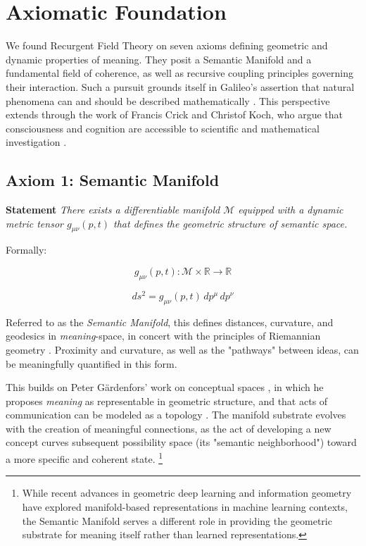 \chapter{Axiomatic Foundation}
\label{1:axiomatic_foundation}

We found Recurgent Field Theory on seven axioms defining geometric and dynamic properties of meaning. They posit a Semantic Manifold and a fundamental field of coherence, as well as recursive coupling principles governing their interaction. Such a pursuit grounds itself in Galileo's assertion that natural phenomena can and should be described mathematically \autocite{Galilei1623}. This perspective extends through the work of Francis Crick and Christof Koch, who argue that consciousness and cognition are accessible to scientific and mathematical investigation \autocite{Crick1990, KochConsciousness2019}.


\section{Axiom 1: Semantic Manifold}
\label{1.1:axiom_1_semantic_manifold}

\textbf{Statement} \textit{There exists a differentiable manifold \(\mathcal{M}\) equipped with a dynamic metric tensor \(g_{\mu\nu}(p,t)\) that defines the geometric structure of semantic space.}

Formally:

\begin{equation}
g_{\mu\nu}(p,t) : \mathcal{M} \times \mathbb{R} \rightarrow \mathbb{R}
\end{equation}

\begin{equation}
ds^2 = g_{\mu\nu}(p,t) \, dp^\mu \, dp^\nu
\end{equation}

Referred to as the \textit{Semantic Manifold}, this defines distances, curvature, and geodesics in \textit{meaning}-space, in concert with the principles of Riemannian geometry \autocite{Riemann1868}. Proximity and curvature, as well as the "pathways" between ideas, can be meaningfully quantified in this form.

This builds on Peter Gärdenfors' work on conceptual spaces \autocite{Gardenfors2000}, in which he proposes \textit{meaning} as representable in geometric structure, and that acts of communication can be modeled as a topology \autocite{Gardenfors2014}. The manifold substrate evolves with the creation of meaningful connections, as the act of developing a new concept curves subsequent possibility space (its "semantic neighborhood") toward a more specific and coherent state. \footnote{While recent advances in geometric deep learning \autocite{Bronstein2021} and information geometry \autocite{Amari2016} have explored manifold-based representations in machine learning contexts, the Semantic Manifold serves a different role in providing the geometric substrate for meaning itself rather than learned representations.}

